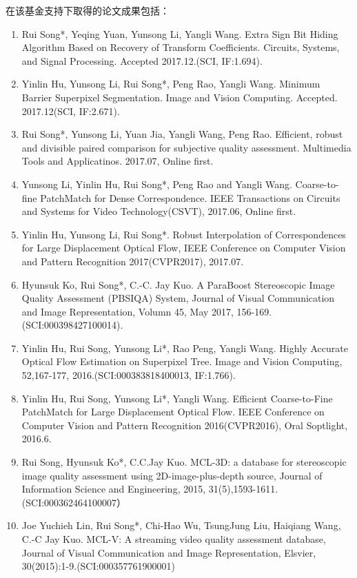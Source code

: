 \documentclass[12pt]{article}
\begin{document}
在该基金支持下取得的论文成果包括：
\begin{enumerate}
    \item Rui Song*, Yeqing Yuan, Yunsong Li, Yangli Wang. Extra Sign Bit Hiding Algorithm Based on Recovery of Transform Coefficients. Circuits, Systems, and Signal Processing. Accepted 2017.12.(SCI, IF:1.694).
    \item Yinlin Hu, Yunsong Li, Rui Song*, Peng Rao, Yangli Wang. Minimum Barrier Superpixel Segmentation. Image and Vision Computing. Accepted. 2017.12(SCI, IF:2.671).
    \item Rui Song*, Yunsong Li, Yuan Jia, Yangli Wang, Peng Rao. Efficient, robust and divisible paired comparison for subjective quality assessment. Multimedia Tools and Applicatinos. 2017.07, Online first.
    \item Yunsong Li, Yinlin Hu, Rui Song*, Peng Rao and Yangli Wang. Coarse-to-fine PatchMatch for Dense Correspondence. IEEE Transactions on Circuits and Systems for Video Technology(CSVT), 2017.06, Online first.
    \item Yinlin Hu, Yunsong Li, Rui Song*. Robust Interpolation of Correspondences for Large Displacement Optical Flow, IEEE Conference on Computer Vision and Pattern Recognition 2017(CVPR2017), 2017.07.  
    \item Hyunsuk Ko, Rui Song*, C.-C. Jay Kuo. A ParaBoost Stereoscopic Image Quality Assessment (PBSIQA) System, Journal of Visual Communication and Image Representation, Volumn 45, May 2017, 156-169.  (SCI:000398427100014).
    \item Yinlin Hu, Rui Song, Yunsong Li*, Rao Peng, Yangli Wang. Highly Accurate Optical Flow Estimation on Superpixel Tree. Image and Vision Computing, 52,167-177, 2016.(SCI:000383818400013, IF:1.766).  
    \item Yinlin Hu, Rui Song, Yunsong Li*, Yangli Wang. Efficient Coarse-to-Fine PatchMatch for Large Displacement Optical Flow. IEEE Conference on Computer Vision and Pattern Recognition 2016(CVPR2016), Oral Soptlight, 2016.6.  
    \item Rui Song, Hyunsuk Ko*, C.C.Jay Kuo. MCL-3D: a database for stereoscopic image quality assessment using 2D-image-plus-depth source, Journal of Information Science and Engineering, 2015, 31(5),1593-1611. (SCI:000362464100007）   
    \item Joe Yuchieh Lin, Rui Song*, Chi-Hao Wu, TsungJung Liu, Haiqiang Wang, C.-C Jay Kuo. MCL-V: A streaming video quality assessment database, Journal of Visual Communication and Image Representation, Elsvier, 30(2015):1-9.(SCI:000357761900001) 
\end{enumerate}
\end{document}
